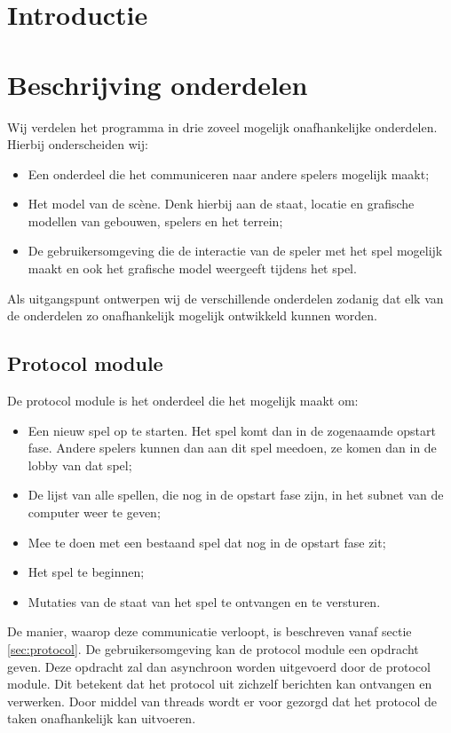 \documentclass[a4paper,11pt, twoside]{article}
\newcommand{\protoref}{sectie \ref{sec:protocol}}
\begin{document}
	
	
	\tableofcontents
	\newpage

	\section{Introductie}
	
	\newpage

    \section{Beschrijving onderdelen}
    Wij verdelen het programma in drie zoveel mogelijk onafhankelijke onderdelen. Hierbij onderscheiden wij:
    \begin{itemize}
    \item Een onderdeel die het communiceren naar andere spelers mogelijk maakt;
	\item Het model van de sc\`ene. Denk hierbij aan de staat, locatie en grafische modellen van gebouwen, spelers en het terrein;
	\item De gebruikersomgeving die de interactie van de speler met het spel mogelijk maakt en ook het grafische model weergeeft tijdens het spel.
    \end{itemize}

    Als uitgangspunt ontwerpen wij de verschillende onderdelen zodanig dat elk van de onderdelen zo onafhankelijk mogelijk ontwikkeld kunnen worden.
    	
    \subsection{Protocol module}
    De protocol module is het onderdeel die het mogelijk maakt om:
	\begin{itemize}
	\item Een nieuw spel op te starten. Het spel komt dan in de zogenaamde opstart fase. Andere spelers kunnen dan aan dit spel meedoen, ze komen dan in de lobby van dat spel;
	\item De lijst van alle spellen, die nog in de opstart fase zijn, in het subnet van de computer weer te geven;
	\item Mee te doen met een bestaand spel dat nog in de opstart fase zit;
	\item Het spel te beginnen;
	\item Mutaties van de staat van het spel te ontvangen en te versturen.
	\end{itemize}
	De manier, waarop deze communicatie verloopt, is beschreven vanaf \protoref. De gebruikersomgeving kan de protocol module een opdracht geven. Deze opdracht zal dan asynchroon worden uitgevoerd door de protocol module. Dit betekent dat het protocol uit zichzelf berichten kan ontvangen en verwerken. Door middel van threads wordt er voor gezorgd dat het protocol de taken onafhankelijk kan uitvoeren.
	
\end{document}
